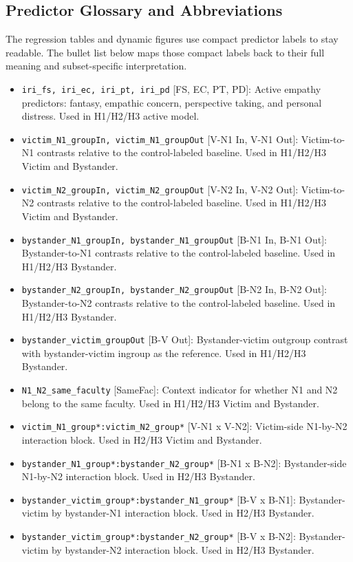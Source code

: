 \documentclass[11pt]{article}
\begin{document}
\subsection{Predictor Glossary and Abbreviations}
The regression tables and dynamic figures use compact predictor labels to stay readable. The bullet list below maps those compact labels back to their full meaning and subset-specific interpretation.
\begin{itemize}
  \item \texttt{iri\_fs, iri\_ec, iri\_pt, iri\_pd} [FS, EC, PT, PD]: Active empathy predictors: fantasy, empathic concern, perspective taking, and personal distress. Used in H1/H2/H3 active model.
  \item \texttt{victim\_N1\_groupIn, victim\_N1\_groupOut} [V-N1 In, V-N1 Out]: Victim-to-N1 contrasts relative to the control-labeled baseline. Used in H1/H2/H3 Victim and Bystander.
  \item \texttt{victim\_N2\_groupIn, victim\_N2\_groupOut} [V-N2 In, V-N2 Out]: Victim-to-N2 contrasts relative to the control-labeled baseline. Used in H1/H2/H3 Victim and Bystander.
  \item \texttt{bystander\_N1\_groupIn, bystander\_N1\_groupOut} [B-N1 In, B-N1 Out]: Bystander-to-N1 contrasts relative to the control-labeled baseline. Used in H1/H2/H3 Bystander.
  \item \texttt{bystander\_N2\_groupIn, bystander\_N2\_groupOut} [B-N2 In, B-N2 Out]: Bystander-to-N2 contrasts relative to the control-labeled baseline. Used in H1/H2/H3 Bystander.
  \item \texttt{bystander\_victim\_groupOut} [B-V Out]: Bystander-victim outgroup contrast with bystander-victim ingroup as the reference. Used in H1/H2/H3 Bystander.
  \item \texttt{N1\_N2\_same\_faculty} [SameFac]: Context indicator for whether N1 and N2 belong to the same faculty. Used in H1/H2/H3 Victim and Bystander.
  \item \texttt{victim\_N1\_group*:victim\_N2\_group*} [V-N1 x V-N2]: Victim-side N1-by-N2 interaction block. Used in H2/H3 Victim and Bystander.
  \item \texttt{bystander\_N1\_group*:bystander\_N2\_group*} [B-N1 x B-N2]: Bystander-side N1-by-N2 interaction block. Used in H2/H3 Bystander.
  \item \texttt{bystander\_victim\_group*:bystander\_N1\_group*} [B-V x B-N1]: Bystander-victim by bystander-N1 interaction block. Used in H2/H3 Bystander.
  \item \texttt{bystander\_victim\_group*:bystander\_N2\_group*} [B-V x B-N2]: Bystander-victim by bystander-N2 interaction block. Used in H2/H3 Bystander.

\end{itemize}
\end{document}
